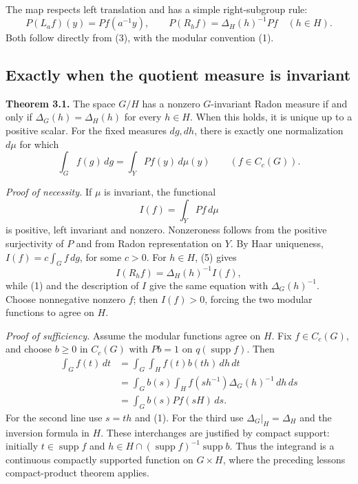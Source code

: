 \documentclass[
  english,
  11pt,
  a4paper,
]{article}
\begin{document}
The map respects left translation and has a simple right-subgroup rule:
\[P(L_a f)(y)=Pf(a^{-1}y),\qquad
P(R_h f)=\Delta_H(h)^{-1}Pf\quad(h\in H).
\tag{5}\] Both follow directly from (3), with the modular convention
(1).

\subsection{Exactly when the quotient measure is
invariant}\label{quotient-measures-and-weils-integration-formula--exactly-when-the-quotient-measure-is-invariant}

\textbf{Theorem 3.1.} The space \(G/H\) has a nonzero \(G\)-invariant
Radon measure if and only if \(\Delta_G(h)=\Delta_H(h)\) for every
\(h\in H\). When this holds, it is unique up to a positive scalar. For
the fixed measures \(dg,dh\), there is exactly one normalization
\(d\mu\) for which \[\int_G f(g)\,dg=\int_Y Pf(y)\,d\mu(y)
\qquad(f\in C_c(G)).
\tag{6}\]

\emph{Proof of necessity.} If \(\mu\) is invariant, the functional
\[I(f)=\int_Y Pf\,d\mu\] is positive, left invariant and nonzero.
Nonzeroness follows from the positive surjectivity of \(P\) and from
Radon representation on \(Y\). By Haar uniqueness,
\(I(f)=c\int_G f\,dg\), for some \(c>0\). For \(h\in H\), (5) gives
\[I(R_h f)=\Delta_H(h)^{-1}I(f),\] while (1) and the description of
\(I\) give the same equation with \(\Delta_G(h)^{-1}\). Choose
nonnegative nonzero \(f\); then \(I(f)>0\), forcing the two modular
functions to agree on \(H\).

\emph{Proof of sufficiency.} Assume the modular functions agree on
\(H\). Fix \(f\in C_c(G)\), and choose \(b\geq0\) in \(C_c(G)\) with
\(Pb=1\) on \(q(\operatorname{supp}f)\). Then \[\begin{aligned}
\int_G f(t)\,dt
&=\int_G\int_H f(t)b(th)\,dh\,dt\\
&=\int_G b(s)\int_H f(sh^{-1})\Delta_G(h)^{-1}\,dh\,ds\\
&=\int_G b(s)Pf(sH)\,ds.
\end{aligned}
\tag{7}\] For the second line use \(s=th\) and (1). For the third use
\(\Delta_G|_H=\Delta_H\) and the inversion formula in \(H\). These
interchanges are justified by compact support: initially
\(t\in\operatorname{supp}f\) and
\(h\in H\cap(\operatorname{supp}f)^{-1}\operatorname{supp}b\). Thus the
integrand is a continuous compactly supported function on \(G\times H\),
where the preceding lesson\textquotesingle s compact-product theorem
applies.
\end{document}
